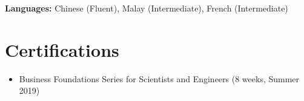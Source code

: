 \documentclass[letterpaper,11pt]{article}
\newcommand{\resumeItem}[2]{
  \item\small{
    \textbf{#1}{: #2 \vspace{-3pt}}
  }
}
\newcommand{\resumeItemAlt}[1]{
  \item\small {#1 \vspace{-3pt}
  }
}
\newcommand{\resumeSubItem}[2]{\resumeItem{#1}{#2}\vspace{-3.5pt}}
\newcommand{\CertificationsSubItem}[1]{\resumeItemAlt{#1}\vspace{-3.5pt}}
\newcommand{\resumeSubHeadingListStart}{\begin{itemize}[leftmargin=*]}
\newcommand{\resumeSubHeadingListEnd}{\end{itemize}}
\begin{document}
      \vspace{1pt}
      
      

      \textbf{Languages:} Chinese (Fluent), Malay (Intermediate), French (Intermediate)




\section{\color{BlueViolet} Certifications}
  \resumeSubHeadingListStart
  
      \CertificationsSubItem {Business Foundations Series for Scientists and Engineers (8 weeks, Summer 2019)}
      
      \begin{comment}
      
      \resumeSubItem{Awards}
      {1st Place Team in Malaysian Math Olympiad (2009), Silver Prize in Australian Mathematics Competition (2009), 2nd Place in high school English Essay Writing Competition (2010), Semi-finalist in Malaysian National Classical Guitar Competition (2010).}
     
      
      \end{comment}
      
      \begin{comment}
      
      \resumeSubItem{Scholarships}
      {Stuff}
      
      \end{comment}
      
  \resumeSubHeadingListEnd


\end{document}
